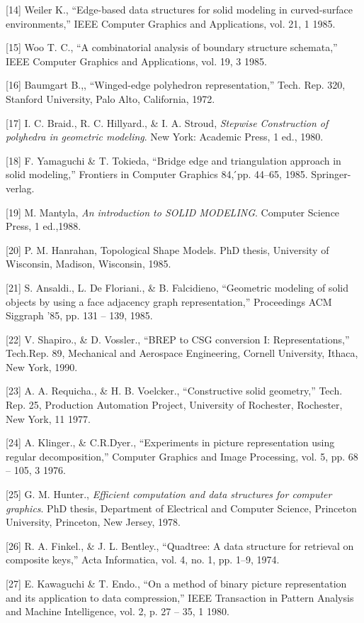 \documentclass[11pt, oneside]{Thesis} %
\begin{document}
[14] Weiler K., “Edge-based data structures for solid modeling in curved-surface environments,”
 IEEE Computer Graphics and Applications, vol. 21, 1 1985.

[15] Woo T. C., “A combinatorial analysis of boundary structure schemata,” IEEE Computer 
Graphics and Applications, vol. 19, 3 1985.

[16] Baumgart B.,, “Winged-edge polyhedron representation,” Tech. Rep. 320, Stanford 
University, Palo Alto, California, 1972.

[17] I. C. Braid., R. C. Hillyard., \& I. A. Stroud, \textit{Stepwise Construction of polyhedra in
geometric modeling}. New York: Academic Press, 1 ed., 1980.

[18] F. Yamaguchi \& T. Tokieda, “Bridge edge and triangulation approach in solid modeling,” 
Frontiers in Computer Graphics 84, ́pp. 44–65, 1985. Springer-verlag.

[19] M. Mantyla, \textit{An introduction to SOLID MODELING}. Computer Science Press, 1 ed.,1988.

[20] P. M. Hanrahan, Topological Shape Models. PhD thesis, University of Wisconsin,
Madison, Wisconsin, 1985.

[21] S. Ansaldi., L. De Floriani., \& B. Falcidieno, “Geometric modeling of solid objects by
using a face adjacency graph representation,” Proceedings ACM Siggraph ’85, pp. 131 – 139, 1985.

[22] V. Shapiro., \& D. Vossler., “BREP to CSG conversion I: Representations,” Tech.Rep. 89,
 Mechanical and Aerospace Engineering, Cornell University, Ithaca, New York, 1990.

[23] A. A. Requicha., \& H. B. Voelcker., “Constructive solid geometry,” Tech. Rep. 25,
Production Automation Project, University of Rochester, Rochester, New York, 11 1977.

[24] A. Klinger., \& C.R.Dyer., “Experiments in picture representation using regular decomposition,”
 Computer Graphics and Image Processing, vol. 5, pp. 68 – 105, 3 1976.

[25] G. M. Hunter., \textit{Efficient computation and data structures for computer graphics}. PhD thesis, 
Department of Electrical and Computer Science, Princeton University, Princeton, New Jersey, 1978.

[26] R. A. Finkel., \& J. L. Bentley., “Quadtree: A data structure for retrieval on composite keys,”
 Acta Informatica, vol. 4, no. 1, pp. 1–9, 1974.

[27] E. Kawaguchi \& T. Endo., “On a method of binary picture representation and its application to
 data compression,” IEEE Transaction in Pattern Analysis and Machine Intelligence, vol. 2, p. 27 – 35, 1 1980.
\end{document}
